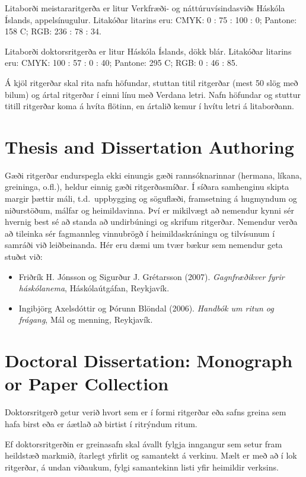 \documentclass[a4paper,12pt,twoside,BCOR=10mm]{scrbook}
\begin{document}
Litaborði meistararitgerða er litur Verkfræði- og náttúruvísindasviðs Háskóla Íslands, appelsínugulur. Litakóðar litarins eru: CMYK:  0 : 75 : 100 : 0; Pantone: 158 C; RGB: 236 : 78 : 34.

Litaborði doktorsritgerða er litur Háskóla Íslands, dökk blár. Litakóðar litarins eru: CMYK: 100 : 57 : 0 : 40; Pantone: 295 C; RGB: 0 : 46 : 85.

Á kjöl ritgerðar skal rita nafn höfundar, stuttan titil ritgerðar (mest 50 slög með bilum) og ártal ritgerðar í einni línu með Verdana letri. Nafn höfundar og stuttur titill ritgerðar koma á hvíta flötinn, en ártalið kemur í hvítu letri á litaborðann.

\section{Thesis and Dissertation Authoring}
Gæði ritgerðar endurspegla ekki einungis gæði rannsóknarinnar (hermana, líkana, greininga, o.fl.), heldur einnig gæði ritgerðasmíðar. Í síðara samhenginu skipta margir þættir máli, t.d.\ uppbygging og söguflæði, framsetning á hugmyndum og niðurstöðum, málfar og heimildavinna. Því er mikilvægt að nemendur kynni sér hvernig best sé að standa að undirbúningi og skrifum ritgerðar. Nemendur verða að tileinka sér fagmannleg vinnubrögð í heimildaskráningu og tilvísunum í samráði við leiðbeinanda. Hér eru dæmi um tvær bækur sem nemendur geta stuðst við:
\begin{itemize}
 \item Friðrík H. Jónsson og Sigurður J. Grétarsson (2007). \textit{Gagnfræðikver fyrir háskólanema}, Háskólaútgáfan, Reykjavík.~\cite{JonssonGretarsson2018}
 \item Ingibjörg Axelsdóttir og Þórunn Blöndal (2006).  \textit{Handbók um ritun og frágang},  Mál og menning, Reykjavík.~\cite{AxelsdottirBlondal2006}
\end{itemize}


\section{Doctoral Dissertation: Monograph or Paper Collection}
Doktorsritgerð getur verið hvort sem er í formi ritgerðar eða safns greina sem hafa birst eða  er áætlað að birtist í ritrýndum ritum. 

Ef doktorsritgerðin er greinasafn skal ávallt fylgja inngangur sem setur fram heildstæð markmið, ítarlegt yfirlit og samantekt á verkinu. Mælt er með að í lok ritgerðar, á undan viðaukum, fylgi samantekinn listi yfir heimildir verksins.
\end{document}
